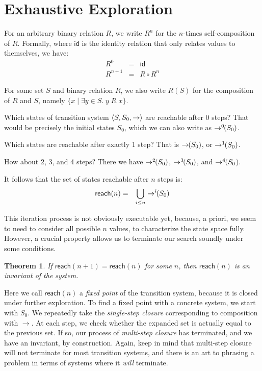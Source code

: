 \documentclass{amsbook}
\newtheorem{theorem}{Theorem}[chapter]
\theoremstyle{definition}
\theoremstyle{remark}
\numberwithin{section}{chapter}
\numberwithin{equation}{chapter}
\begin{document}
\section{Exhaustive Exploration}

For an arbitrary binary relation $R$, we write $R^n$ for the $n$-times self-composition of $R$.
Formally, where $\mathsf{id}$ is the identity relation that only relates values to themselves, we have:
\begin{eqnarray*}
  R^0 &=& \mathsf{id} \\
  R^{n+1} &=& R \circ R^n
\end{eqnarray*}

For some set $S$ and binary relation $R$, we also write $R(S)$ for the composition of $R$ and $S$, namely $\{x \mid \exists y \in S. \; y \; R \; x\}$.

\newcommand{\ns}[0]{\hspace{-.05in}}

Which states of transition system ${\left \langle S, S_0, \to \right \rangle}$ are reachable after 0 steps?
That would be precisely the initial states $S_0$, which we can also write as $\to^0\ns(S_0)$.

Which states are reachable after exactly 1 step?
That is $\to\ns(S_0)$, or $\to^1\ns(S_0)$.

How about 2, 3, and 4 steps?
There we have $\to^2\ns(S_0)$, $\to^3\ns(S_0)$, and $\to^4\ns(S_0$).

It follows that the set of states reachable after $n$ steps is:
\begin{eqnarray*}
  \mathsf{reach}(n) &=& \bigcup_{i \leq n} \to^i\ns(S_0)
\end{eqnarray*}

This iteration process is not obviously executable yet, because, a priori, we seem to need to consider all possible $n$ values, to characterize the state space fully.
However, a crucial property allows us to terminate our search soundly under some conditions.

\begin{theorem}
  \invariants
  If $\mathsf{reach}(n+1) = \mathsf{reach}(n)$ for some $n$, then $\mathsf{reach}(n)$ is an invariant of the system.
\end{theorem}

Here we call $\mathsf{reach}(n)$ a \emph{fixed point} of the transition system, because it is closed under further exploration.
To find a fixed point with a concrete system, we start with $S_0$.
We repeatedly take the \emph{single-step closure} corresponding to composition with $\to$.
At each step, we check whether the expanded set is actually equal to the previous set.
If so, our process of \emph{multi-step closure} has terminated, and we have an invariant, by construction.
Again, keep in mind that multi-step closure will not terminate for most transition systems, and there is an art to phrasing a problem in terms of systems where it \emph{will} terminate.
\end{document}
